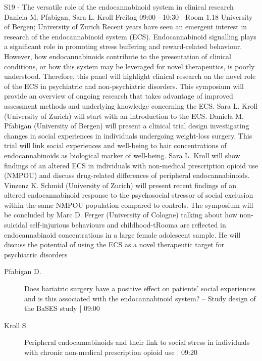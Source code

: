 
            \begin{symposium}
            {S19 - The versatile role of the endocannabinoid system in clinical research}
            {Daniela M. Pfabigan, Sara L. Kroll}
            {Freitag 09:00 - 10:30 | Room 1.18}
            {University of Bergen; University of Zurich}
            Recent years have seen an emergent interest in research of the endocannabinoid system (ECS). Endocannabinoid signalling plays a significant role in promoting stress buffering and reward-related behaviour. However, how endocannabinoids contribute to the presentation of clinical conditions, or how this system may be leveraged for novel therapeutics, is poorly understood. Therefore, this panel will highlight clinical research on the novel role of the ECS in psychiatric and non-psychiatric disorders.
This symposium will provide an overview of ongoing research that takes advantage of improved assessment methods and underlying knowledge concerning the ECS. Sara L. Kroll (University of Zurich) will start with an introduction to the ECS. Daniela M. Pfabigan (University of Bergen) will present a clinical trial design investigating changes in social experiences in individuals undergoing weight-loss surgery. This trial will link social experiences and well-being to hair concentrations of endocannabinoids as biological marker of well-being. Sara L. Kroll will show findings of an altered ECS in individuals with non-medical prescription opioid use (NMPOU) and discuss drug-related differences of peripheral endocannabinoids. Vinzenz K. Schmid (University of Zurich) will present recent findings of an altered endocannabinoid response to the psychosocial stressor of social exclusion within the same NMPOU population compared to controls. The symposium will be concluded by Marc D. Ferger (University of Cologne) talking about how non-suicidal self-injurious behaviours and childhood-tRooma are reflected in endocannabinoid concentrations in a large female adolescent sample. He will discuss the potential of using the ECS as a novel therapeutic target for psychiatric disorders
            \begin{description}    
            
                \item [ Pfabigan D.] Does bariatric surgery have a positive effect on patients’ social experiences and is this associated with the endocannabinoid system? – Study design of the BaSES study \textcolor{mygray}{ | 09:00}    
                
                \item [ Kroll S.] Peripheral endocannabinoids and their link to social stress in individuals with chronic non-medical prescription opioid use \textcolor{mygray}{ | 09:20}    
                

\end{description}
\end{symposium}
